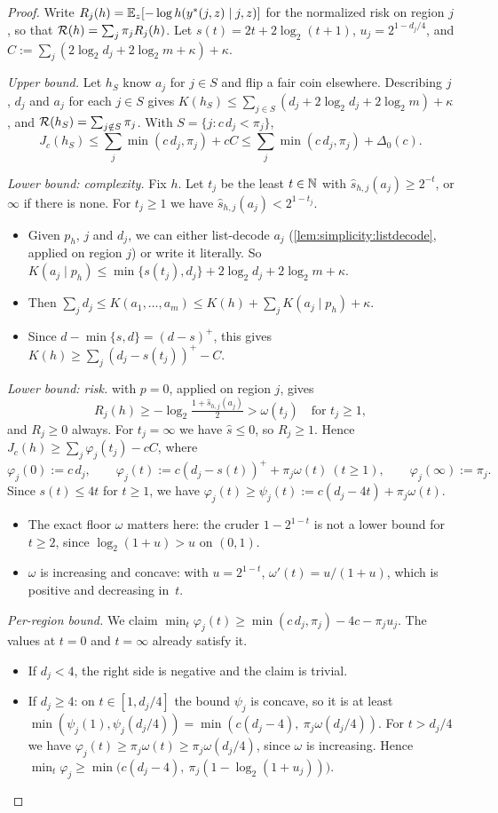 \begin{proof}
Write $R_j(h)=\mathbb{E}_{z}[-\log h(y^*(j,z)\mid j,z)]$ for the normalized risk on region $j$, so that $\mathcal R(h)=\sum_j\pi_jR_j(h)$. Let $s(t)=2t+2\log_2(t+1)$, $u_j=2^{1-d_j/4}$, and $C:=\sum_j(2\log_2d_j+2\log_2m+\kappa)+\kappa$.

\emph{Upper bound.} Let $h_S$ know $a_j$ for $j\in S$ and flip a fair coin elsewhere. Describing $j$, $d_j$ and $a_j$ for each $j\in S$ gives $K(h_S)\le\sum_{j\in S}(d_j+2\log_2d_j+2\log_2m)+\kappa$, and $\mathcal R(h_S)=\sum_{j\notin S}\pi_j$. With $S=\{j:c\,d_j<\pi_j\}$,
\[
J_c(h_S)\le\textstyle\sum_j\min(c\,d_j,\pi_j)+cC\le\sum_j\min(c\,d_j,\pi_j)+\Delta_0(c).
\]

\emph{Lower bound: complexity.} Fix $h$. Let $t_j$ be the least $t\in\mathbb{N}$ with $\hat s_{h,j}(a_j)\ge2^{-t}$, or $\infty$ if there is none. For $t_j\ge1$ we have $\hat s_{h,j}(a_j)<2^{1-t_j}$.
\begin{itemize}
\item Given $p_h$, $j$ and $d_j$, we can either list-decode $a_j$ (\cref{lem:simplicity:listdecode}, applied on region $j$) or write it literally. So $K(a_j\mid p_h)\le\min\{s(t_j),d_j\}+2\log_2d_j+2\log_2m+\kappa$.
\item Then $\sum_jd_j\le K(a_1,\dots,a_m)\le K(h)+\sum_jK(a_j\mid p_h)+\kappa$.
\item Since $d-\min\{s,d\}=(d-s)^+$, this gives $K(h)\ge\sum_j(d_j-s(t_j))^+-C$.
\end{itemize}

\emph{Lower bound: risk.}  with $p=0$, applied on region $j$, gives
\[
R_j(h)\ge-\log_2\tfrac{1+\hat s_{h,j}(a_j)}2>\omega(t_j)\quad\text{for }t_j\ge1,
\]
and $R_j\ge0$ always. For $t_j=\infty$ we have $\hat s\le0$, so $R_j\ge1$. Hence $J_c(h)\ge\sum_j\varphi_j(t_j)-cC$, where
\[
\varphi_j(0):=c\,d_j,\qquad\varphi_j(t):=c(d_j-s(t))^++\pi_j\omega(t)\ (t\ge1),\qquad\varphi_j(\infty):=\pi_j.
\]
Since $s(t)\le4t$ for $t\ge1$, we have $\varphi_j(t)\ge\psi_j(t):=c(d_j-4t)+\pi_j\omega(t)$.
\begin{itemize}
\item The exact floor $\omega$ matters here: the cruder $1-2^{1-t}$ is not a lower bound for $t\ge2$, since $\log_2(1+u)>u$ on $(0,1)$.
\item $\omega$ is increasing and concave: with $u=2^{1-t}$, $\omega'(t)=u/(1+u)$, which is positive and decreasing in~$t$.
\end{itemize}

\emph{Per-region bound.} We claim $\min_t\varphi_j(t)\ge\min(c\,d_j,\pi_j)-4c-\pi_ju_j$. The values at $t=0$ and $t=\infty$ already satisfy it.
\begin{itemize}
\item If $d_j<4$, the right side is negative and the claim is trivial.
\item If $d_j\ge4$: on $t\in[1,d_j/4]$ the bound $\psi_j$ is concave, so it is at least $\min(\psi_j(1),\psi_j(d_j/4))=\min(c(d_j-4),\ \pi_j\omega(d_j/4))$. For $t>d_j/4$ we have $\varphi_j(t)\ge\pi_j\omega(t)\ge\pi_j\omega(d_j/4)$, since $\omega$ is increasing. Hence $\min_t\varphi_j\ge\min\big(c(d_j-4),\ \pi_j(1-\log_2(1+u_j))\big)$.
\end{itemize}


\end{proof}
